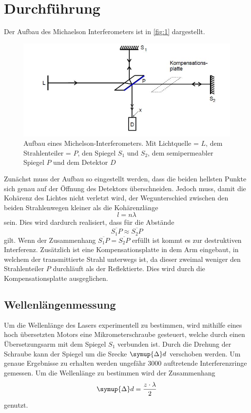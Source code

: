 \newpage
\section{Durchführung}
Der Aufbau des Michaelson Interferometers ist in \autoref{fig:1} dargestellt. 

\begin{figure}
    \centering
    \includegraphics[scale = 0.7]{Picture/Pic1.JPG}
    \caption{Aufbau eines Michelson-Interferometers.
            Mit Lichtquelle = $L$, dem Strahlenteiler = $P$, den Spiegel $S_1$ und $S_2$, dem semipermeabler Spiegel $P$ und dem Detektor $D$ \cite{V401}}
    \label{fig:1}
  \end{figure}

Zunächst muss der Aufbau so eingestellt werden, dass die beiden hellsten Punkte sich genau auf der 
Öffnung des Detektors überschneiden. Jedoch muss, damit die Kohärenz des Lichtes nicht verletzt wird, der Wegunterschied zwischen den beiden Strahlenwegen kleiner als die Kohärenzlänge 
\begin{equation*}
    l = n \lambda
  \end{equation*}
\noindent
sein. Dies wird dardurch realisiert, dass für die Abstände 
\begin{equation*}
    \overline{S_1 P} \approx \overline{S_2 P}
    \label{eqn:close}
\end{equation*}
\noindent
gilt. Wenn der Zusammenhang $\overline{S_1 P} = \overline{S_2 P}$ erfüllt ist kommt es zur destruktiven Interferenz. Zusätzlich ist eine Kompensationsplatte in dem Arm eingebaut, 
in welchem der transmittierte Strahl unterwegs ist, da dieser zweimal weniger den Strahlenteiler $P$ durchläuft als der Reflektierte. Dies wird durch die Kompensationsplatte ausgeglichen.
\noindent


\subsection{Wellenlängenmessung}
Um die Wellenlänge des Lasers experimentell zu bestimmen, wird mithilfe eines hoch übersetzten Motors eine Mikrometerschraube gesteuert, welche durch einen Übersetzungsarm mit dem 
Spiegel $S_1$ verbunden ist. Durch die Drehung der Schraube kann der Spiegel um die Srecke $\symup{\Delta} d$ verschoben werden. Um genaue Ergebnisse zu erhalten werden ungefähr 
3000 auftretende Interferenzringe gemessen. 
Um die Wellenlänge zu bestimmen wird der Zusammenhang
\begin{equation}
    \symup{\Delta}d = \frac{z \cdot \lambda}{2}
    \label{eqn:d1}
\end{equation}
\noindent
genutzt. 

